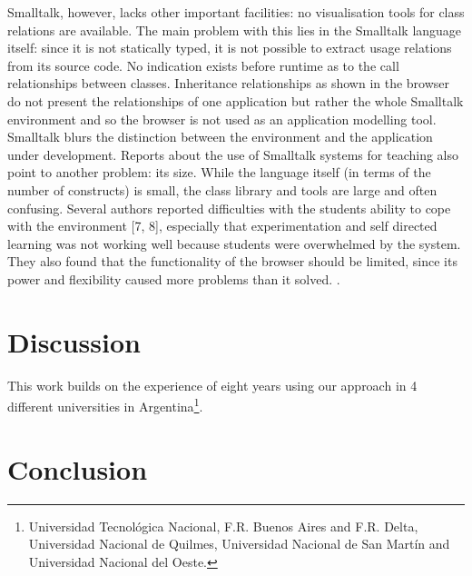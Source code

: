 \documentclass[preprint,10pt]{sigplanconf}
\begin{document}
Smalltalk, however, lacks other important facilities: no visualisation tools for class
relations are available. The main problem with this lies in the Smalltalk language
itself: since it is not statically typed, it is not possible to extract usage relations from
its source code. No indication exists before runtime as to the call relationships
between classes. Inheritance relationships as shown in the browser do not present
the relationships of one application but rather the whole Smalltalk environment and
so the browser is not used as an application modelling tool. Smalltalk blurs the
distinction between the environment and the application under development.
Reports about the use of Smalltalk systems for teaching also point to another
problem: its size. While the language itself (in terms of the number of constructs) is
small, the class library and tools are large and often confusing. Several authors
reported difficulties with the students ability to cope with the environment [7, 8],
especially that experimentation and self directed learning was not working well
because students were overwhelmed by the system. They also found that the
functionality of the browser should be limited, since its power and flexibility caused
more problems than it solved. \cite{kolling_problem_1999}.




\section{Discussion}
\label{sec:discussion}


This work builds on the experience of eight years using our approach in 4 different universities in Argentina\footnote{Universidad Tecnológica Nacional, F.R. Buenos Aires and F.R. Delta, 
Universidad Nacional de Quilmes, Universidad Nacional de San Martín and Universidad Nacional del Oeste.}.





\section{Conclusion}
\label{sec:conclusion}
\end{document}
